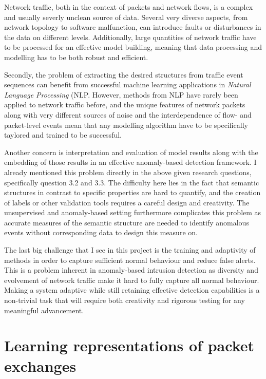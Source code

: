 \documentclass[a4paper,12pt,twoside]{report}
\begin{document}
Network traffic, both in the context of packets and network flows, is a complex and usually severly unclean source of data. Several very diverse aspects, from network topology to software malfunction, can introduce faults or disturbances in the data on different levels. Additionally, large quantities of network traffic have to be processed for an effective model building, meaning that data processing and modelling has to be both robust and efficient.

Secondly, the problem of extracting the desired structures from traffic event sequences can benefit from successful machine learning applications in \textit{Natural Language Processing} (NLP. However, methods from NLP have rarely been applied to network traffic before, and the unique features of network packets along with very different sources of noise and the interdependence of flow- and packet-level events mean that any modelling algorithm have to be specifically taylored and trained to be successful. 

Another concern is interpretation and evaluation of model results along with the embedding of those results in an effective anomaly-based detection framework. I already mentioned this problem directly in the above given research questions, specifically question 3.2 and 3.3. The difficulty here lies in the fact that semantic structures in contrast to specific properties are hard to quantify, and the creation of labels or other validation tools requires a careful design and creativity. The unsupervised and anomaly-based setting furthermore complicates this problem as accurate measures of the semantic structure are needed to identify anomalous events without corresponding data to design this measure on.

The last big challenge that I see in this project is the training and adaptivity of methods in order to capture sufficient normal behaviour and reduce false alerts. This is a problem inherent in anomaly-based intrusion detection as diversity and evolvement of network traffic make it hard to fully capture all normal behaviour. Making a system adaptive while still retaining effective detection capabilities is 
a non-trivial task that will require both creativity and rigorous testing for any meaningful advancement.






\section{Learning representations of packet exchanges}\label{Repr}
\end{document}
